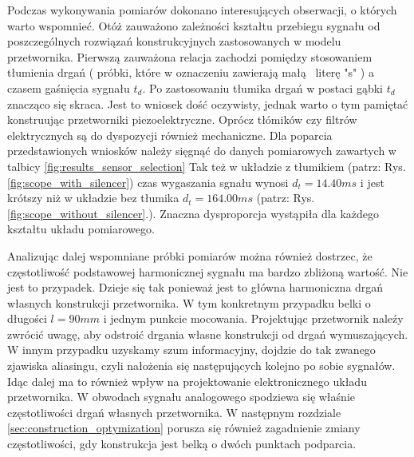 \indent Podczas wykonywania pomiarów dokonano interesujących obserwacji, o których warto 
wspomnieć. Otóż zauważono zależności kształtu przebiegu sygnału od poszczególnych 
rozwiązań konstrukcyjnych zastosowanych w modelu przetwornika. Pierwszą zauważona relacja
zachodzi pomiędzy stosowaniem tłumienia drgań ( próbki, które w oznaczeniu zawierają małą 
literę "s" ) a czasem gaśnięcia sygnału $t_d$. Po zastosowaniu tłumika drgań w postaci gąbki $t_d$ 
znacząco się skraca. Jest to wniosek dość oczywisty, jednak 
 warto o tym pamiętać konstruując przetworniki piezoelektryczne. Oprócz tłómików czy 
 filtrów elektrycznych są do dyspozycji również mechaniczne. Dla poparcia przedstawionych
 wniosków należy sięgnąć do danych pomiarowych zawartych w talbicy \ref{fig:results_sensor_selection}
 Tak też w układzie z tłumikiem (patrz: Rys.\ref{fig:scope_with_silencer}) czas wygaszania sgnału 
 wynosi $d_t = 14.40 ms$ i jest krótszy niż w układzie bez tłumika 
 $d_t = 164.00 ms$ (patrz: Rys.\ref{fig:scope_without_silencer}.). 
 Znaczna dysproporcja wystąpiła dla każdego kształtu układu pomiarowego.

\indent Analizując dalej wspomniane próbki pomiarów można również dostrzec, że częstotliwość 
podstawowej harmonicznej sygnału ma bardzo zbliżoną wartość. Nie jest to przypadek. 
Dzieje się tak ponieważ jest to główna harmoniczna drgań własnych konstrukcji przetwornika. 
W tym konkretnym przypadku belki o długości $l = 90 mm$ i jednym punkcie mocowania. 
Projektując przetwornik naleźy zwrócić uwagę, aby odstroić drgania własne konstrukcji 
od drgań wymuszających. W innym przypadku uzyskamy szum informacyjny, dojdzie do tak zwanego
zjawiska aliasingu, czyli nałożenia się następujących kolejno po sobie sygnałów. Idąc dalej 
ma to również wpływ na projektowanie elektronicznego układu przetwornika. W obwodach sygnału 
analogowego spodziewa się właśnie częstotliwości drgań własnych przetwornika. W następnym 
rozdziale \ref{sec:construction_optymization} porusza się również zagadnienie zmiany częstotliwości, 
gdy konstrukcja jest belką o dwóch punktach podparcia. 

